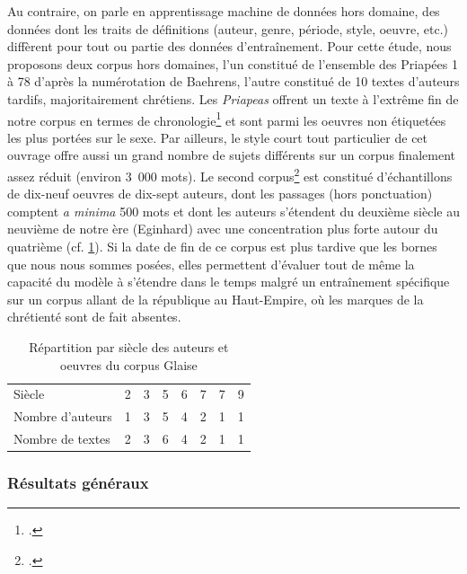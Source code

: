 Au contraire, on parle en apprentissage machine de données hors domaine, des données dont les traits de définitions (auteur, genre, période, style, oeuvre, etc.) diffèrent pour tout ou partie des données d'entraînement. Pour cette étude, nous proposons deux corpus hors domaines, l'un constitué de l'ensemble des Priapées 1 à 78 d'après la numérotation de Baehrens, l'autre constitué de 10 textes d'auteurs tardifs, majoritairement chrétiens. Les \textit{Priapeas} offrent un texte à l'extrême fin de notre corpus en termes de chronologie\footcite{citroni_les_2008} et sont parmi les oeuvres non étiquetées les plus portées sur le sexe. Par ailleurs, le style court tout particulier de cet ouvrage offre aussi un grand nombre de sujets différents sur un corpus finalement assez réduit (environ 3~000 mots). Le second corpus\footcite{glaise_2020_corpus_tardif} est constitué d'échantillons de dix-neuf oeuvres de dix-sept auteurs, dont les passages (hors ponctuation) comptent \textit{a minima} 500 mots et dont les auteurs s'étendent du deuxième siècle au neuvième de notre ère (Eginhard) avec une concentration plus forte autour du quatrième (cf. \ref{corpus:glaise:dates}). Si la date de fin de ce corpus est plus tardive que les bornes que nous nous sommes posées, elles permettent d'évaluer tout de même la capacité du modèle à s'étendre dans le temps malgré un entraînement spécifique sur un corpus allant de la république au Haut-Empire, où les marques de la chrétienté sont de fait absentes.

\begin{table}[h]
\begin{tabular}{l|rrrrrrr}
Siècle           & 2 & 3 & 5 & 6 & 7 & 7 & 9 \\
Nombre d'auteurs & 1 & 3 & 5 & 4 & 2 & 1 & 1 \\
Nombre de textes & 2 & 3 & 6 & 4 & 2 & 1 & 1
\end{tabular}
\caption{Répartition par siècle des auteurs et oeuvres du corpus Glaise}
\label{corpus:glaise:dates}
\end{table}

\subsubsection{Résultats généraux}

